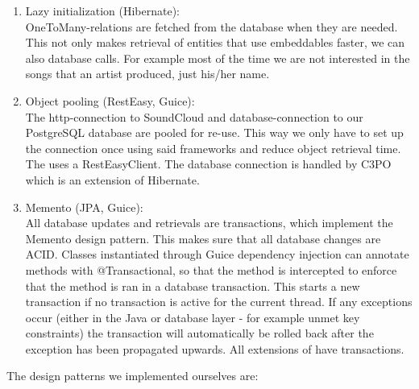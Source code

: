 \begin{enumerate}
\item Lazy initialization (Hibernate):\\
OneToMany-relations are fetched from the database when they are needed.
This not only makes retrieval of entities that use embeddables faster, we can also database calls.
For example most of the time we are not interested in the songs that an artist produced, just his/her name.

\item Object pooling (RestEasy, Guice):\\
The http-connection to SoundCloud and database-connection to our PostgreSQL database are pooled for re-use.
This way we only have to set up the connection once using said frameworks and reduce object retrieval time.
The  uses a RestEasyClient.
The database connection is handled by C3PO which is an extension of Hibernate.

\item Memento (JPA, Guice):\\
All database updates and retrievals are transactions, which implement the Memento design pattern.
This makes sure that all database changes are ACID\cite{ACID}.
Classes instantiated through Guice dependency injection can annotate methods with @Transactional, so that the method is intercepted to enforce that the method is ran in a database transaction.
This starts a new transaction if no transaction is active for the current thread.
If any exceptions occur (either in the Java or database layer - for example unmet key constraints) the transaction will automatically be rolled back after the exception has been propagated upwards.
All extensions of  have transactions.
\end{enumerate}

The design patterns we implemented ourselves are:

